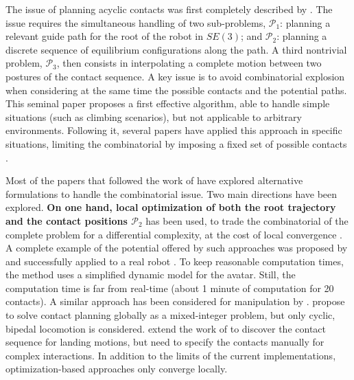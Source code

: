 The issue of planning acyclic contacts was first completely described by \citeauthor{Bretl:2006:MPM:1124573.1124585}. The issue requires the simultaneous handling of two sub-problems, $\mathcal{P}_1$: planning a relevant guide path for the root of the robot in $SE(3)$; and $\mathcal{P}_2$: planning a discrete sequence of equilibrium configurations along the path. A third nontrivial problem, $\mathcal{P}_3$, 
then consists in interpolating a complete motion between two postures of the contact sequence.  A key issue is to avoid combinatorial explosion when considering at the same time the possible contacts and the potential paths. This seminal paper proposes a first effective algorithm, able to handle simple situations (such as climbing scenarios), but not applicable to arbitrary environments. Following it, seve\-ral papers have applied this approach in specific situations, limiting the combinatorial by imposing a fixed set of possible contacts \citep{Hauser06usingmotion, stilman2010}.

Most of the papers that followed the work of \citeauthor{Bretl:2006:MPM:1124573.1124585} have explored alternative formulations to handle the combinatorial issue. Two main directions have been explored. \textbf{On one hand, local optimization of both the root trajectory \Pa and the contact positions $\mathcal{P}_2$} has been used, to trade the combinatorial of the complete problem for a differential complexity, at the cost of local convergence \citep{1631739}. A complete example of the potential offered by such approaches was proposed by \cite{Mordatch:2012:DCB:2185520.2185539} and successfully applied to a real robot \citep{mordatch2015}. To keep reasonable computation times, the method uses a simplified dynamic model for the avatar. Still, the computation time is far from real-time  (about 1 minute of computation for 20 contacts).  A similar approach has been considered for manipulation by \cite{gabicciniisrr15}. \citeauthor{DBLP:conf/humanoids/DeitsT14} propose to solve contact planning globally as a mixed-integer problem, but only cyclic, bipedal locomotion is considered. 
\citeauthor{dai2014whole} extend the work of \citeauthor{Posa:2014:DMT:2568343.2568352} to discover the contact sequence for landing motions, but need to specify
the contacts manually for complex interactions.
In addition to the limits of the current implementations, optimization-based approaches only converge locally.

